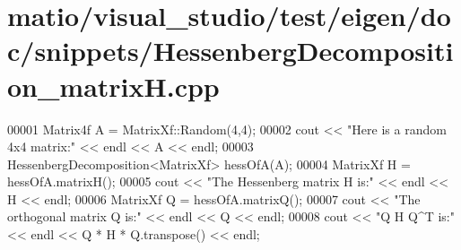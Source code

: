 \hypertarget{matio_2visual__studio_2test_2eigen_2doc_2snippets_2_hessenberg_decomposition__matrix_h_8cpp_source}{}\section{matio/visual\+\_\+studio/test/eigen/doc/snippets/\+Hessenberg\+Decomposition\+\_\+matrixH.cpp}
\label{matio_2visual__studio_2test_2eigen_2doc_2snippets_2_hessenberg_decomposition__matrix_h_8cpp_source}

\begin{DoxyCode}
00001 Matrix4f A = MatrixXf::Random(4,4);
00002 cout << \textcolor{stringliteral}{"Here is a random 4x4 matrix:"} << endl << A << endl;
00003 HessenbergDecomposition<MatrixXf> hessOfA(A);
00004 MatrixXf H = hessOfA.matrixH();
00005 cout << \textcolor{stringliteral}{"The Hessenberg matrix H is:"} << endl << H << endl;
00006 MatrixXf Q = hessOfA.matrixQ();
00007 cout << \textcolor{stringliteral}{"The orthogonal matrix Q is:"} << endl << Q << endl;
00008 cout << \textcolor{stringliteral}{"Q H Q^T is:"} << endl << Q * H * Q.transpose() << endl;
\end{DoxyCode}
